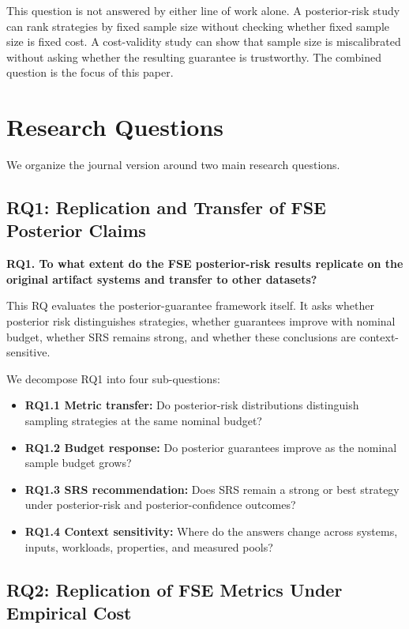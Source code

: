 \documentclass[smallcondensed]{svjour3}
\providecommand{\tightlist}{%
  \setlength{\itemsep}{0pt}\setlength{\parskip}{0pt}}
\begin{document}
This question is not answered by either line of work alone. A
posterior-risk study can rank strategies by fixed sample size without
checking whether fixed sample size is fixed cost. A cost-validity study
can show that sample size is miscalibrated without asking whether the
resulting guarantee is trustworthy. The combined question is the focus
of this paper.

\section{Research Questions}\label{research-questions}

We organize the journal version around two main research questions.

\subsection{RQ1: Replication and Transfer of FSE Posterior
Claims}\label{rq1-replication-and-transfer-of-fse-posterior-claims}

\textbf{RQ1. To what extent do the FSE posterior-risk results replicate
on the original artifact systems and transfer to other datasets?}

This RQ evaluates the posterior-guarantee framework itself. It asks
whether posterior risk distinguishes strategies, whether guarantees
improve with nominal budget, whether SRS remains strong, and whether
these conclusions are context-sensitive.

We decompose RQ1 into four sub-questions:

\begin{itemize}
\tightlist
\item
  \textbf{RQ1.1 Metric transfer:} Do posterior-risk distributions
  distinguish sampling strategies at the same nominal budget?
\item
  \textbf{RQ1.2 Budget response:} Do posterior guarantees improve as the
  nominal sample budget grows?
\item
  \textbf{RQ1.3 SRS recommendation:} Does SRS remain a strong or best
  strategy under posterior-risk and posterior-confidence outcomes?
\item
  \textbf{RQ1.4 Context sensitivity:} Where do the answers change across
  systems, inputs, workloads, properties, and measured pools?
\end{itemize}

\subsection{RQ2: Replication of FSE Metrics Under Empirical
Cost}\label{rq2-replication-of-fse-metrics-under-empirical-cost}
\end{document}

